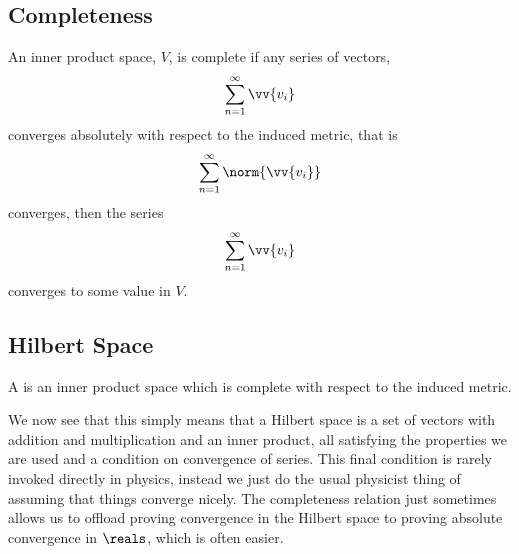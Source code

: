     \subsection{Completeness}
    An inner product space, \(V\), is complete if any series of vectors,
    \begin{equation}
        \sum_{n=1}^{\infty} \vv{v_i}
    \end{equation}
    converges absolutely with respect to the induced metric, that is
    \begin{equation}
        \sum_{n=1}^{\infty} \norm{\vv{v_i}}
    \end{equation}
    converges, then the series
    \begin{equation}
        \sum_{n=1}^{\infty} \vv{v_i}
    \end{equation}
    converges to some value in \(V\).
    
    \subsection{Hilbert Space}
    A  is an inner product space which is complete with respect to the induced metric.
    
    We now see that this simply means that a Hilbert space is a set of vectors with addition and multiplication and an inner product, all satisfying the properties we are used and a condition on convergence of series.
    This final condition is rarely invoked directly in physics, instead we just do the usual physicist thing of assuming that things converge nicely.
    The completeness relation just sometimes allows us to offload proving convergence in the Hilbert space to proving absolute convergence in \(\reals\), which is often easier.